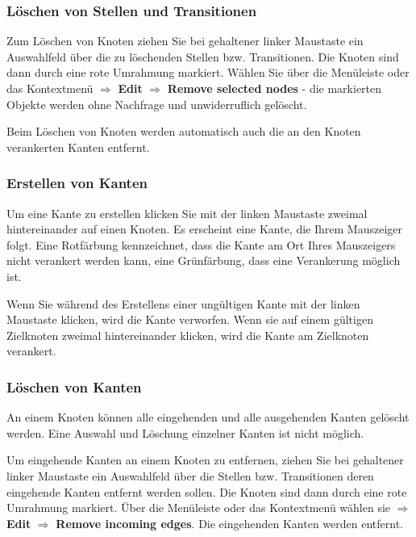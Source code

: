 \documentclass[11pt]{article}
\begin{document}
\subsubsection{Löschen von Stellen und Transitionen}
\label{sec-2-2-4}

    Zum Löschen von Knoten ziehen Sie bei gehaltener linker Maustaste
    ein Auswahlfeld über die zu löschenden Stellen
    bzw. Transitionen. Die Knoten sind dann durch eine rote Umrahmung
    markiert. Wählen Sie über die Menüleiste oder das Kontextmenü
    $\Rightarrow$ \textbf{Edit} $\Rightarrow$ \textbf{Remove selected nodes} - die
    markierten Objekte werden ohne Nachfrage und unwiderruflich
    gelöscht.  

    Beim Löschen von Knoten werden automatisch auch die an den Knoten
    verankerten Kanten entfernt.
\subsubsection{Erstellen von Kanten}
\label{sec-2-2-5}

    Um eine Kante zu erstellen klicken Sie mit der linken Maustaste
    zweimal hintereinander auf einen Knoten.  Es erscheint eine Kante,
    die Ihrem Mauszeiger folgt.  Eine Rotfärbung kennzeichnet, dass
    die Kante am Ort Ihres Mauszeigers nicht verankert werden kann,
    eine Grünfärbung, dass eine Verankerung möglich ist.

    Wenn Sie während des Erstellens einer ungültigen Kante mit der
    linken Maustaste klicken, wird die Kante verworfen.  Wenn sie auf
    einem gültigen Zielknoten zweimal hintereinander klicken, wird die
    Kante am Zielknoten verankert.
\subsubsection{Löschen von Kanten}
\label{sec-2-2-6}

    An einem Knoten können alle eingehenden und alle ausgehenden
    Kanten gelöscht werden.  Eine Auswahl und Löschung einzelner
    Kanten ist nicht möglich.
    
    Um eingehende Kanten an einem Knoten zu entfernen, ziehen Sie bei
    gehaltener linker Maustaste ein Auswahlfeld über die Stellen
    bzw. Transitionen deren eingehende Kanten entfernt werden sollen.
    Die Knoten sind dann durch eine rote Umrahmung markiert.  Über die
    Menüleiste oder das Kontextmenü wählen sie $\Rightarrow$ \textbf{Edit}
    $\Rightarrow$ \textbf{Remove incoming edges}. Die eingehenden Kanten werden
    entfernt.
\end{document}
